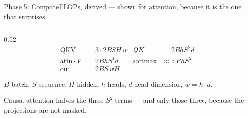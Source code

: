 \documentclass[aspectratio=169,11pt]{beamer}
\newcommand{\subtle}[1]{{\footnotesize\color{nxSlate}#1}}
\begin{document}
\begin{frame}{Phase 5: Compute}{FLOPs, derived --- shown for attention, because it is the one that surprises}
  \vspace{0.15cm}
  \begin{columns}[T]
    \begin{column}{0.52\textwidth}
      \vspace{0.1cm}
      {\footnotesize
      \begin{align*}
        \text{QKV} &= 3 \cdot 2BSH\,w &
        QK^{\top}  &= 2Bh S^2 d \\[3pt]
        \text{attn}\!\cdot\!V &= 2Bh S^2 d &
        \text{softmax} &\approx 5\,Bh S^2 \\[3pt]
        \text{out}  &= 2BS\,wH
      \end{align*}}

      \vspace{0.2cm}
      \subtle{$B$ batch, $S$ sequence, $H$ hidden, $h$ heads, $d$ head
      dimension, $w = h\cdot d$.}

      \vspace{0.25cm}
      \subtle{Causal attention halves the three $S^2$ terms --- and only
      those three, because the projections are not masked.}


\end{column}
\end{columns}
\end{frame}
\end{document}
